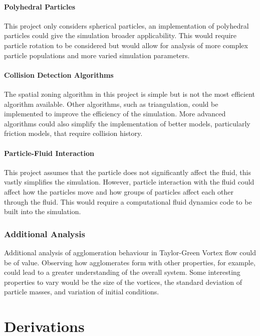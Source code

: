 \documentclass[a4paper,11pt,titlepage]{report}
\begin{document}
\subsubsection{Polyhedral Particles}
This project only considers spherical particles, an implementation of polyhedral particles could give the simulation broader applicability. This would require particle rotation to be considered but would allow for analysis of more complex particle populations and more varied simulation parameters.
\subsubsection{Collision Detection Algorithms}
The spatial zoning algorithm in this project is simple but is not the most efficient algorithm available. Other algorithms, such as triangulation\cite{dynamictriangulations}, could be implemented to improve the efficiency of the simulation. More advanced algorithms could also simplify the implementation of better models, particularly friction models, that require collision history.
\subsubsection{Particle-Fluid Interaction}
This project assumes that the particle does not significantly affect the fluid, this vastly simplifies the simulation. However, particle interaction with the fluid could affect how the particles move and how groups of particles affect each other through the fluid. This would require a computational fluid dynamics code to be built into the simulation.
\subsection{Additional Analysis}
Additional analysis of agglomeration behaviour in Taylor-Green Vortex flow could be of value. Observing how agglomerates form with other properties, for example, could lead to a greater understanding of the overall system. Some interesting properties to vary would be the size of the vortices, the standard deviation of particle masses, and variation of initial conditions.
\appendix
\chapter{Derivations}
\label{ch:Derivations}
\end{document}
